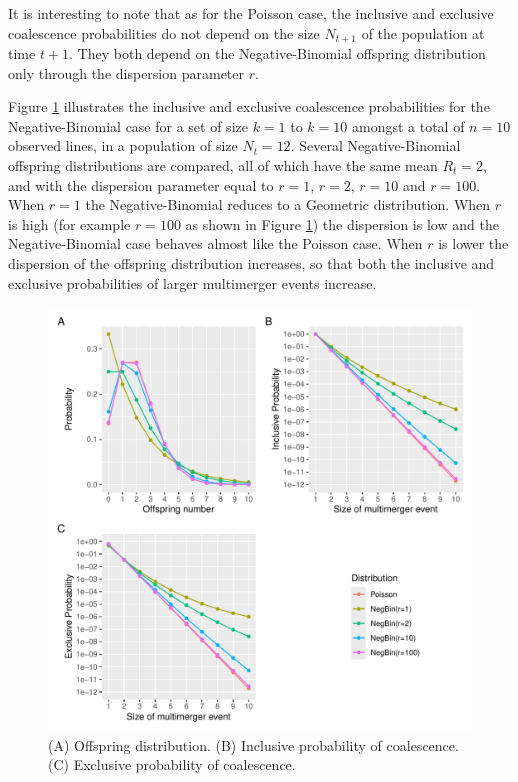 \documentclass{article}
\begin{document}
It is interesting to note that as for the Poisson case, the inclusive and exclusive coalescence probabilities do not depend on the size $N_{t+1}$ of the population at time $t+1$.
They both depend on the 
Negative-Binomial offspring distribution only through the dispersion parameter $r$.

Figure \ref{fig:negbin} illustrates the inclusive and exclusive coalescence probabilities for
the Negative-Binomial case for a set of size $k=1$ to $k=10$ amongst a total of $n=10$
 observed lines, in a population of size $N_t=12$. 
Several Negative-Binomial offspring distributions are compared, 
all of which have the same mean $R_t=2$,
and with the dispersion parameter equal to $r=1$, $r=2$, $r=10$ and $r=100$.
When $r=1$ the Negative-Binomial reduces to a Geometric distribution.
When $r$ is high (for example $r=100$ as shown in Figure \ref{fig:negbin}) 
the dispersion is low and the Negative-Binomial case 
behaves almost like the Poisson case. When $r$ is lower the dispersion of the
offspring distribution increases, so that 
both the inclusive and exclusive probabilities of larger multimerger events increase.

\begin{figure}[!t]
\begin{center}
\includegraphics[width=15cm]{../run/figureNegBin.pdf}
\end{center}
\caption{(A) Offspring distribution. (B) Inclusive probability of coalescence. (C) Exclusive probability of coalescence.
\label{fig:negbin}}
\end{figure}
\end{document}
